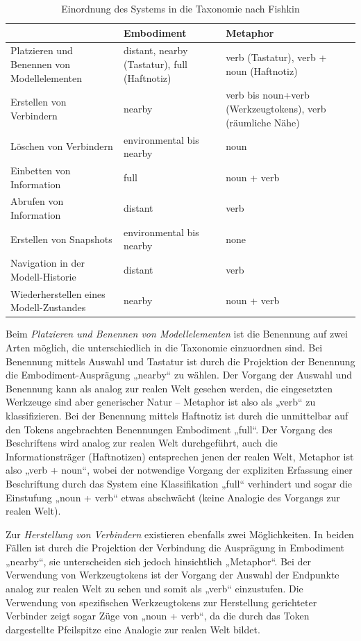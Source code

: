 \begin{table}[htbp]
	\centering
	\caption{Einordnung des Systems in die Taxonomie nach Fishkin}
	\begin{tabular}{| p{6cm} || p{3cm} | p{3cm} |} 
		\hline
		 & Embodiment & Metaphor \\ \hline \hline
		Platzieren und Benennen von Modellelementen & distant, nearby (Tastatur), full (Haftnotiz) & verb (Tastatur), verb + noun (Haftnotiz) \\ \hline
		Erstellen von Verbindern & nearby & verb bis noun+verb (Werkzeugtokens), verb (räumliche Nähe)\\ \hline
		Löschen von Verbindern & environmental bis nearby & noun \\ \hline
		Einbetten von Information & full & noun + verb \\ \hline
		Abrufen von Information & distant & verb \\ \hline
		Erstellen von Snapshots & environmental bis nearby & none \\ \hline
		Navigation in der Modell-Historie & distant & verb \\ \hline
		Wiederherstellen eines Modell-Zustandes & nearby & noun + verb\\ \hline		
	\end{tabular}
	\label{tab:einordnungFishkin}
\end{table}

Beim \emph{Platzieren und Benennen von Modellelementen} ist die Benennung auf zwei Arten möglich, die unterschiedlich in die Taxonomie einzuordnen sind. Bei Benennung mittels Auswahl und Tastatur ist durch die Projektion der Benennung die Embodiment-Ausprägung „nearby“ zu wählen. Der Vorgang der Auswahl und Benennung kann als analog zur realen Welt gesehen werden, die eingesetzten Werkzeuge sind aber generischer Natur -- Metaphor ist also als „verb“ zu klassifizieren. Bei der Benennung mittels Haftnotiz ist durch die unmittelbar auf den Tokens angebrachten Benennungen Embodiment „full“. Der Vorgang des Beschriftens wird analog zur realen Welt durchgeführt, auch die Informationsträger (Haftnotizen) entsprechen jenen der realen Welt, Metaphor ist also „verb + noun“, wobei  der notwendige Vorgang der expliziten Erfassung einer Beschriftung durch das System eine Klassifikation „full“ verhindert und sogar die Einstufung „noun + verb“ etwas abschwächt (keine Analogie des Vorgangs zur realen Welt).

Zur \emph{Herstellung von Verbindern} existieren ebenfalls zwei Möglichkeiten. In beiden Fällen ist durch die Projektion der Verbindung die Ausprägung in Embodiment „nearby“, sie unterscheiden sich jedoch hinsichtlich „Metaphor“. Bei der Verwendung von Werkzeugtokens ist der Vorgang der Auswahl der Endpunkte analog zur realen Welt zu sehen und somit als „verb“ einzustufen. Die Verwendung von spezifischen Werkzeugtokens zur Herstellung gerichteter Verbinder zeigt sogar Züge von „noun + verb“, da die durch das Token dargestellte Pfeilspitze eine Analogie zur realen Welt bildet.

